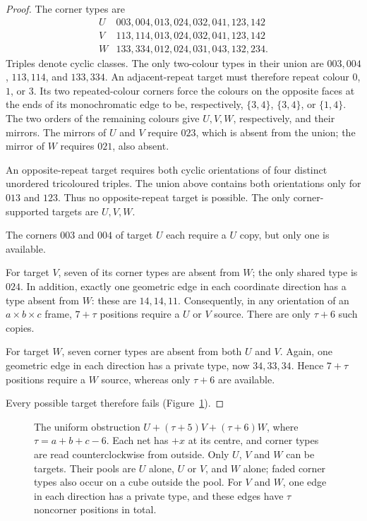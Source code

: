 \begin{proof}
The corner types are
\[
\begin{array}{c|l}
 U&003,004,013,024,032,041,123,142\\
 V&113,114,013,024,032,041,123,142\\
 W&133,334,012,024,031,043,132,234.
\end{array}
\]
Triples denote cyclic classes. The only two-colour types in their union
are $003,004$, $113,114$, and $133,334$. An adjacent-repeat target must
therefore repeat colour $0$, $1$, or $3$. Its two repeated-colour corners
force the colours on the opposite faces at the ends of its monochromatic
edge to be, respectively, $\{3,4\}$, $\{3,4\}$, or $\{1,4\}$.
The two orders of the remaining colours give $U,V,W$, respectively, and
their mirrors. The mirrors of $U$ and $V$ require $023$, which is absent
from the union; the mirror of $W$ requires $021$, also absent.

An opposite-repeat target requires both cyclic orientations of four
distinct unordered tricoloured triples. The union above contains both
orientations only for $013$ and $123$. Thus no opposite-repeat target
is possible. The only corner-supported targets are $U,V,W$.

The corners $003$ and $004$ of target $U$ each require a $U$ copy, but only
one is available.

For target $V$, seven of its corner types are absent from $W$; the only
shared type is $024$. In addition, exactly one geometric edge in each
coordinate direction has a type absent from $W$: these are $14,14,11$.
Consequently, in any orientation of an $a\times b\times c$ frame,
$7+\tau$ positions require a $U$ or $V$ source. There are only $\tau+6$
such copies.

For target $W$, seven corner types are absent from both $U$ and $V$.
Again, one geometric edge in each direction has a private type, now
$34,33,34$. Hence $7+\tau$ positions require a $W$ source, whereas only
$\tau+6$ are available.

Every possible target therefore fails
(Figure~\ref{fig:uniform-obstruction}).
\end{proof}

\begin{figure}[ht]
\centering

\caption{The uniform obstruction $U+(\tau+5)V+(\tau+6)W$, where $\tau=a+b+c-6$.
Each net has $+x$ at its centre, and corner types are read
counterclockwise from outside. Only $U$, $V$ and $W$ can be targets.
Their pools are $U$ alone, $U$ or $V$, and $W$ alone; faded corner types
also occur on a cube outside the pool. For $V$ and $W$, one edge in each
direction has a private type, and these edges have $\tau$ noncorner positions
in total.}
\label{fig:uniform-obstruction}
\end{figure}

